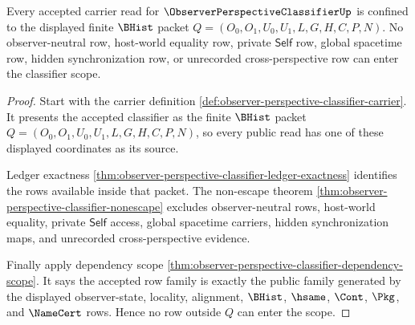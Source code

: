 \begin{theorem}
\label{thm:observer-perspective-classifier-bhist-scope}
Every accepted carrier read for $\ObserverPerspectiveClassifierUp$ is confined to the displayed finite $\BHist$ packet $Q=(O_0,O_1,U_0,U_1,L,G,H,C,P,N)$. No observer-neutral row, host-world equality row, private $\mathsf{Self}$ row, global spacetime row, hidden synchronization row, or unrecorded cross-perspective row can enter the classifier scope.
\end{theorem}
\begin{proof}
Start with the carrier definition \autoref{def:observer-perspective-classifier-carrier}. It presents the accepted classifier as the finite $\BHist$ packet $Q=(O_0,O_1,U_0,U_1,L,G,H,C,P,N)$, so every public read has one of these displayed coordinates as its source.

Ledger exactness \autoref{thm:observer-perspective-classifier-ledger-exactness} identifies the rows available inside that packet. The non-escape theorem \autoref{thm:observer-perspective-classifier-nonescape} excludes observer-neutral rows, host-world equality, private $\mathsf{Self}$ access, global spacetime carriers, hidden synchronization maps, and unrecorded cross-perspective evidence.

Finally apply dependency scope \autoref{thm:observer-perspective-classifier-dependency-scope}. It says the accepted row family is exactly the public family generated by the displayed observer-state, locality, alignment, $\BHist$, $\hsame$, $\Cont$, $\Pkg$, and $\NameCert$ rows. Hence no row outside $Q$ can enter the scope.
\end{proof}

